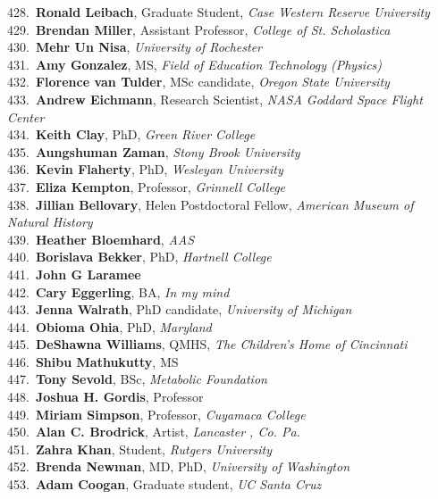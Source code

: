 428.~{\bf Ronald Leibach}, Graduate Student, {\sl Case Western Reserve University} \\
429.~{\bf Brendan Miller}, Assistant Professor, {\sl College of St. Scholastica} \\
430.~{\bf Mehr Un Nisa}, {\sl University of Rochester} \\
431.~{\bf Amy Gonzalez}, MS, {\sl Field of Education Technology (Physics)} \\
432.~{\bf Florence van Tulder}, MSc candidate, {\sl Oregon State University} \\
433.~{\bf Andrew Eichmann}, Research Scientist, {\sl NASA Goddard Space Flight Center} \\
434.~{\bf Keith Clay}, PhD, {\sl Green River College} \\
435.~{\bf Aungshuman Zaman}, {\sl Stony Brook University} \\
436.~{\bf Kevin Flaherty}, PhD, {\sl Wesleyan University} \\
437.~{\bf Eliza Kempton}, Professor, {\sl Grinnell College} \\
438.~{\bf Jillian Bellovary}, Helen Postdoctoral Fellow, {\sl American Museum of Natural History} \\
439.~{\bf Heather Bloemhard}, {\sl AAS} \\
440.~{\bf Borislava Bekker}, PhD, {\sl Hartnell College} \\
441.~{\bf John G Laramee} \\
442.~{\bf Cary Eggerling}, BA, {\sl In my mind} \\
443.~{\bf Jenna Walrath}, PhD candidate, {\sl University of Michigan} \\
444.~{\bf Obioma Ohia}, PhD, {\sl Maryland} \\
445.~{\bf DeShawna Williams}, QMHS, {\sl The Children's Home of Cincinnati } \\
446.~{\bf Shibu Mathukutty}, MS \\
447.~{\bf Tony Sevold}, BSc, {\sl Metabolic Foundation} \\
448.~{\bf Joshua H. Gordis}, Professor \\
449.~{\bf Miriam Simpson}, Professor, {\sl Cuyamaca College} \\
450.~{\bf Alan C. Brodrick}, Artist, {\sl Lancaster , Co. Pa.} \\
451.~{\bf Zahra Khan}, Student, {\sl Rutgers University} \\
452.~{\bf Brenda Newman}, MD, PhD, {\sl University of Washington } \\
453.~{\bf Adam Coogan}, Graduate student, {\sl UC Santa Cruz} \\
